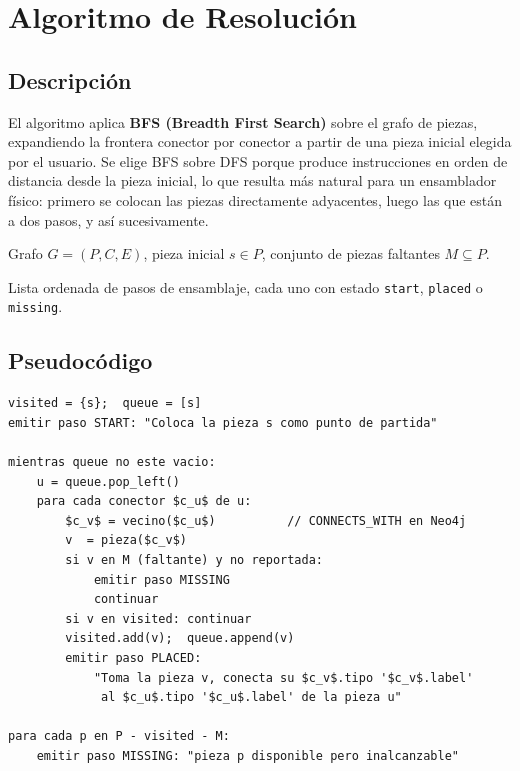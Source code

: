 \documentclass[12pt,a4paper]{article}
\begin{document}
\section{Algoritmo de Resolución}

\subsection{Descripción}

El algoritmo aplica \textbf{BFS (Breadth First Search)} sobre el grafo de
piezas, expandiendo la frontera conector por conector a partir de una pieza
inicial elegida por el usuario. Se elige BFS sobre DFS porque produce
instrucciones en orden de distancia desde la pieza inicial, lo que resulta más
natural para un ensamblador físico: primero se colocan las piezas directamente
adyacentes, luego las que están a dos pasos, y así sucesivamente.

\begin{description}[leftmargin=2.5cm]
    \item[Entrada]  Grafo $G = (P, C, E)$, pieza inicial $s \in P$, conjunto de piezas faltantes $M \subseteq P$.
    \item[Salida]   Lista ordenada de pasos de ensamblaje, cada uno con estado
                    \texttt{start}, \texttt{placed} o \texttt{missing}.
\end{description}

\subsection{Pseudocódigo}

\begin{lstlisting}[mathescape=true, caption={BFS de ensamblaje}]
visited = {s};  queue = [s]
emitir paso START: "Coloca la pieza s como punto de partida"

mientras queue no este vacio:
    u = queue.pop_left()
    para cada conector $c_u$ de u:
        $c_v$ = vecino($c_u$)          // CONNECTS_WITH en Neo4j
        v  = pieza($c_v$)
        si v en M (faltante) y no reportada:
            emitir paso MISSING
            continuar
        si v en visited: continuar
        visited.add(v);  queue.append(v)
        emitir paso PLACED:
            "Toma la pieza v, conecta su $c_v$.tipo '$c_v$.label'
             al $c_u$.tipo '$c_u$.label' de la pieza u"

para cada p en P - visited - M:
    emitir paso MISSING: "pieza p disponible pero inalcanzable"
\end{lstlisting}
\end{document}
